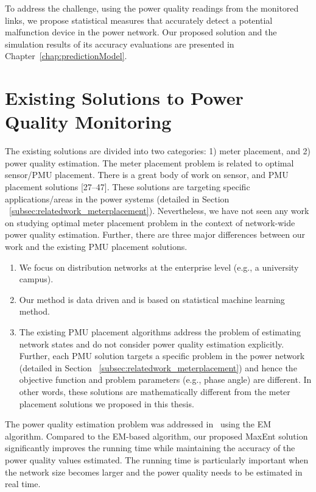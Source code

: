 To address the challenge, using the power quality readings from the monitored links, we propose statistical measures that accurately detect a potential malfunction device in the power network. Our proposed solution and the simulation results of its accuracy evaluations are presented in Chapter~\ref{chap:predictionModel}.

\section{Existing Solutions to Power Quality Monitoring}
The existing solutions are divided into two categories: 1) meter placement, and 2) power quality estimation. The meter placement problem is related to optimal sensor/PMU placement. There is a great body of work on sensor, and PMU placement solutions [27--47]. These solutions are targeting specific applications/areas in the power systems (detailed in Section ~\ref{subsec:relatedwork_meterplacement}). Nevertheless, we have not seen any work on studying optimal meter placement problem in the context of network-wide power quality estimation. Further, there are three major differences between our work and the existing PMU placement solutions.

\begin{enumerate}
\item We focus on distribution networks at the enterprise level (e.g., a university campus).
\item Our method is data driven and is based on statistical machine learning method.
\item The existing PMU placement algorithms address the problem of estimating network states and do not consider power quality estimation explicitly. Further, each PMU solution targets a specific problem in the power network (detailed in Section ~\ref{subsec:relatedwork_meterplacement}) and hence the objective function and problem parameters (e.g., phase angle) are different. In other words, these solutions are mathematically different from the meter placement solutions we proposed in this thesis.
\end{enumerate}

The power quality estimation problem was addressed in~\cite{catherine_pri} using the EM algorithm. Compared to the EM-based algorithm, our proposed MaxEnt solution significantly improves the running time while maintaining the accuracy of the power quality values estimated. The running time is particularly important when the network size becomes larger and the power quality needs to be estimated in real time.



